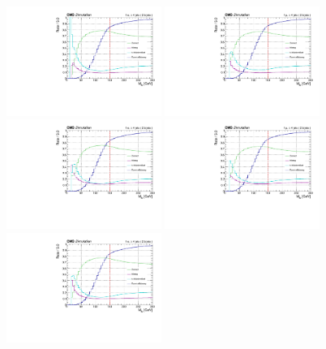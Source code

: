 \begin{figure}[p]
    \centering
    \includegraphics[width=0.45\textwidth]{figure/bbSep_16_el_OptCut_chi2_20_bbSep.pdf}
    \includegraphics[width=0.45\textwidth]{figure/bbSep_16_mu_OptCut_chi2_20_bbSep.pdf}
    \includegraphics[width=0.45\textwidth]{figure/bbSep_17_el_OptCut_chi2_20_bbSep.pdf}
    \includegraphics[width=0.45\textwidth]{figure/bbSep_17_mu_OptCut_chi2_20_bbSep.pdf}
    \includegraphics[width=0.45\textwidth]{figure/bbSep_18_el_OptCut_chi2_20_bbSep.pdf}

\end{figure}
